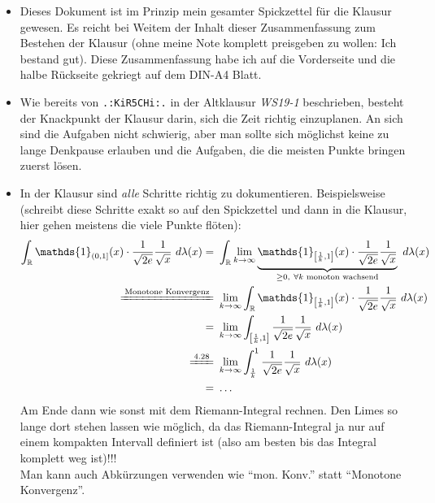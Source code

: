 \begin{itemize}
	\item Dieses Dokument ist im Prinzip mein gesamter Spickzettel für die Klausur gewesen. Es reicht bei Weitem der Inhalt dieser Zusammenfassung zum Bestehen der Klausur (ohne meine Note komplett preisgeben zu wollen: Ich bestand gut). Diese Zusammenfassung habe ich auf die Vorderseite und die halbe Rückseite gekriegt auf dem DIN-A4 Blatt.

	\item Wie bereits von \texttt{.:KiR5CHi:.} in der Altklausur \textit{WS19-1} beschrieben, besteht der Knackpunkt der Klausur darin, sich die Zeit richtig einzuplanen. An sich sind die Aufgaben nicht schwierig, aber man sollte sich möglichst keine zu lange Denkpause erlauben und die Aufgaben, die die meisten Punkte bringen zuerst lösen.

	\item In der Klausur sind \textit{alle} Schritte richtig zu dokumentieren. Beispielsweise (schreibt diese Schritte exakt so auf den Spickzettel und dann in die Klausur, hier gehen meistens die viele Punkte flöten):
	\begin{align*}
		\int_{\R} \mathds{1}_{(0,1]}(x)\cdot\frac{1}{\sqrt{2e}}\frac{1}{\sqrt{x}}~d\lambda(x)=\ &\int_{\R} \limfty{k}\underbrace{\mathds{1}_{\left[\frac{1}{k},1\right]}(x)\cdot\frac{1}{\sqrt{2e}}\frac{1}{\sqrt{x}}}_{\geq 0,~\forall k \text{ monoton wachsend}}~d\lambda(x)\\
		\xlongequal{\text{Monotone Konvergenz}}\ &\limfty{k}\int_{\R}\mathds{1}_{\left[\frac{1}{k},1\right]}(x)\cdot\frac{1}{\sqrt{2e}}\frac{1}{\sqrt{x}}~d\lambda(x)\\
		=\ &\limfty{k}\int_{\left[\frac{1}{k},1\right]}\frac{1}{\sqrt{2e}}\frac{1}{\sqrt{x}}~d\lambda(x)\\
		\xlongequal{\text{4.28}}\ &\limfty{k}\int_{\frac{1}{k}}^1 \frac{1}{\sqrt{2e}}\frac{1}{\sqrt{x}}~d\lambda(x)\\
		=\ &\ldots
	\end{align*}
	Am Ende dann wie sonst mit dem Riemann-Integral rechnen. Den Limes so lange dort stehen lassen wie möglich, da das Riemann-Integral ja nur auf einem kompakten Intervall definiert ist (also am besten bis das Integral komplett weg ist)!!!\\
    Man kann auch Abkürzungen verwenden wie ``mon. Konv.'' statt ``Monotone Konvergenz''.
\end{itemize}
